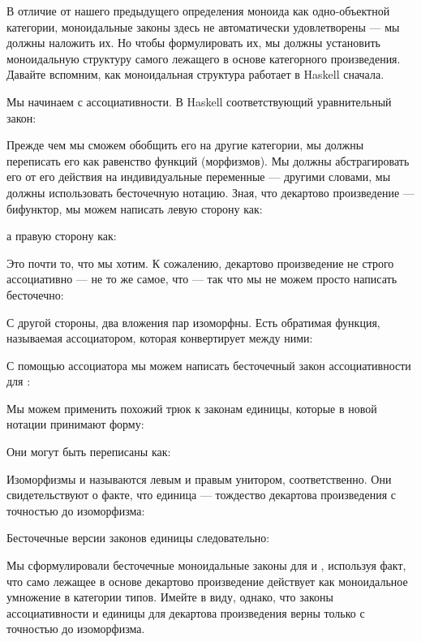 В отличие от нашего предыдущего определения моноида как одно-объектной
категории, моноидальные законы здесь не автоматически удовлетворены --- мы должны
наложить их. Но чтобы формулировать их, мы должны установить
моноидальную структуру самого лежащего в основе категорного произведения. Давайте
вспомним, как моноидальная структура работает в Haskell сначала.

Мы начинаем с ассоциативности. В Haskell соответствующий уравнительный
закон:

Прежде чем мы сможем обобщить его на другие категории, мы должны переписать его
как равенство функций (морфизмов). Мы должны абстрагировать его
от его действия на индивидуальные переменные --- другими словами, мы должны
использовать бесточечную нотацию. Зная, что декартово произведение ---
бифунктор, мы можем написать левую сторону как:

а правую сторону как:

Это почти то, что мы хотим. К сожалению, декартово произведение не
строго ассоциативно ---  не то же самое, что
 --- так что мы не можем просто написать бесточечно:

С другой стороны, два вложения пар изоморфны. Есть
обратимая функция, называемая ассоциатором, которая конвертирует между ними:

С помощью ассоциатора мы можем написать бесточечный
закон ассоциативности для :

Мы можем применить похожий трюк к законам единицы, которые в новой нотации
принимают форму:

Они могут быть переписаны как:

Изоморфизмы  и  называются левым
и правым унитором, соответственно. Они свидетельствуют о факте, что единица
\code{()} --- тождество декартова произведения с точностью до изоморфизма:


Бесточечные версии законов единицы следовательно:

Мы сформулировали бесточечные моноидальные законы для  и
, используя факт, что само лежащее в основе декартово произведение
действует как моноидальное умножение в категории типов. Имейте в
виду, однако, что законы ассоциативности и единицы для декартова
произведения верны только с точностью до изоморфизма.

